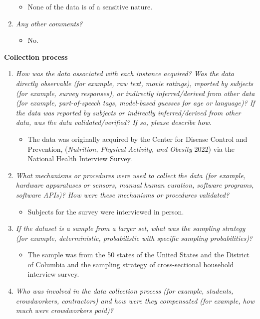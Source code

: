 \documentclass[
]{article}
\providecommand{\tightlist}{%
  \setlength{\itemsep}{0pt}\setlength{\parskip}{0pt}}
\begin{document}
\begin{enumerate}
  \begin{itemize}
  \tightlist
  \item
    None of the data is of a sensitive nature.
  \end{itemize}
\item
  \emph{Any other comments?}

  \begin{itemize}
  \tightlist
  \item
    No.
  \end{itemize}
\end{enumerate}

\newpage

\textbf{Collection process}

\begin{enumerate}
\def\labelenumi{\arabic{enumi}.}
\tightlist
\item
  \emph{How was the data associated with each instance acquired? Was the
  data directly observable (for example, raw text, movie ratings),
  reported by subjects (for example, survey responses), or indirectly
  inferred/derived from other data (for example, part-of-speech tags,
  model-based guesses for age or language)? If the data was reported by
  subjects or indirectly inferred/derived from other data, was the data
  validated/verified? If so, please describe how.}

  \begin{itemize}
  \tightlist
  \item
    The data was originally acquired by the Center for Disease Control
    and Prevention, (\emph{Nutrition, Physical Activity, and Obesity}
    2022) via the National Health Interview Survey.
  \end{itemize}
\item
  \emph{What mechanisms or procedures were used to collect the data (for
  example, hardware apparatuses or sensors, manual human curation,
  software programs, software APIs)? How were these mechanisms or
  procedures validated?}

  \begin{itemize}
  \tightlist
  \item
    Subjects for the survey were interviewed in person.
  \end{itemize}
\item
  \emph{If the dataset is a sample from a larger set, what was the
  sampling strategy (for example, deterministic, probabilistic with
  specific sampling probabilities)?}

  \begin{itemize}
  \tightlist
  \item
    The sample was from the 50 states of the United States and the
    District of Columbia and the sampling strategy of cross-sectional
    household interview survey.
  \end{itemize}
\item
  \emph{Who was involved in the data collection process (for example,
  students, crowdworkers, contractors) and how were they compensated
  (for example, how much were crowdworkers paid)?}


\end{enumerate}
\end{document}
